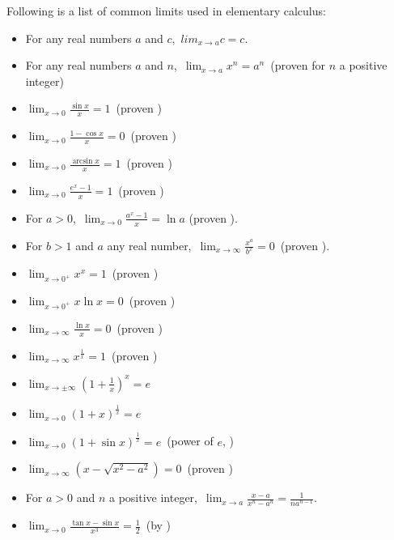 \documentclass[12pt]{article}
\begin{document}
Following is a list of common limits used in elementary calculus:

\begin{itemize}
\item For any real numbers $a$ and $c$,\, $lim_{x\to a} c=c$.
\item For any real numbers $a$ and $n$,\, $\lim_{x\to a} x^n = a^n$\, 
(proven  for $n$ a positive integer)
\item $\lim_{x\to 0} \frac{\sin{x}}{x}=1$\, (proven )
\item $\lim_{x\to 0} \frac{1-\cos{x}}{x}=0$\, (proven )
\item $\lim_{x\to 0} \frac{\arcsin{x}}{x}=1$\, (proven )
\item $\lim_{x\to 0} \frac{e^x-1}{x}=1$\, (proven )
\item For $a>0$,\, $\lim_{x\to 0} \frac{a^x-1}{x}=\ln a$ (proven ).
\item For $b>1$ and $a$ any real number,\, $\lim_{x\to\infty}\frac{x^a}{b^x} = 0$\, (proven ).
\item $\lim_{x\to 0^+} x^x = 1$\, (proven )
\item $\lim_{x\to 0^+} x\ln{x} = 0$\, (proven )
\item $\lim_{x\to\infty} \frac{\ln{x}}{x} = 0$\, (proven )
\item $\lim_{x\to\infty} x^\frac{1}{x} = 1$\, (proven )
\item $\lim_{x\to\pm\infty}\left(1+\frac{1}{x}\right)^x = e$
\item $\lim_{x\to 0}\left(1+x\right)^\frac{1}{x} = e$
\item $\lim_{x\to 0}(1+\sin{x})^\frac{1}{x} = e$\, (power of $e$, )
\item $\lim_{x\to\infty}(x-\sqrt{x^2-a^2}) = 0$\, (proven )
\item For $a>0$ and $n$ a positive integer,\, $\lim_{x\to a} \frac{x-a}{x^n-a^n}= \frac{1}{na^{n-1}}$.
\item $\lim_{x\to 0} \frac{\tan x-\sin x}{x^3}= \frac{1}{2}$\, (by )

\end{itemize}
\end{document}
